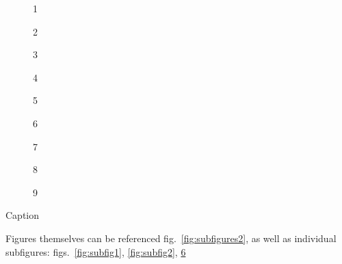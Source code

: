 \begin{pandoccrossrefsubfigures}

\begin{subfigure}{1.0\linewidth}\caption{1\label{fig:subfig21}}\end{subfigure}%

\begin{subfigure}{1.0\linewidth}\caption{2\label{fig:subfig22}}\end{subfigure}%

\begin{subfigure}{1.0\linewidth}\caption{3}\end{subfigure}%

\begin{subfigure}{1.0\linewidth}\caption{4\label{fig:subfig24}}\end{subfigure}%

\begin{subfigure}{1.0\linewidth}\caption{5}\end{subfigure}%

\begin{subfigure}{1.0\linewidth}\caption{6\label{fig:subfig26}}\end{subfigure}%

\begin{subfigure}{1.0\linewidth}\caption{7\label{fig:subfig27}}\end{subfigure}%

\begin{subfigure}{1.0\linewidth}\caption{8}\end{subfigure}%

\begin{subfigure}{1.0\linewidth}\caption{9\label{fig:subfig29}}\end{subfigure}%

\caption{Caption}\label{fig:subfigures2}

\end{pandoccrossrefsubfigures}

Figures themselves can be referenced fig.~\ref{fig:subfigures2}, as well
as individual subfigures:
figs.~\ref{fig:subfig1}, \ref{fig:subfig2}, \ref{fig:subfig29}
